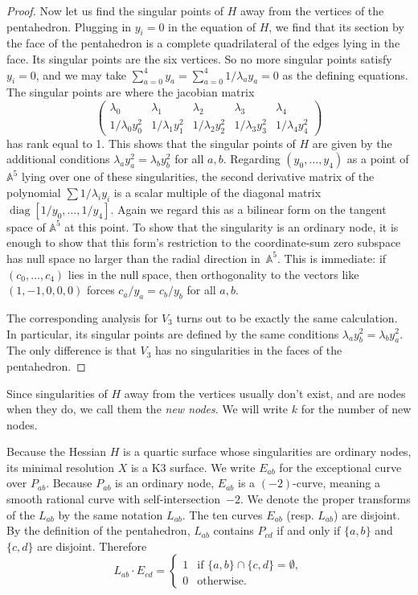 \documentclass[11pt]{article}
\theoremstyle{definition}
\numberwithin{equation}{section}
\numberwithin{figure}{section}
\numberwithin{table}{section}
\newcommand{\bbA}{{\mathbb{A}}}
\DeclareMathOperator{\diag}{diag}
\begin{document}
\begin{proof}
Now let us find the singular points of $H$ away from the vertices of the pentahedron. Plugging in $y_i = 0$ in the equation of $H$, we find that its section by the face of the pentahedron is a complete quadrilateral of the edges lying in the face. Its singular points are the six vertices. So no more singular points satisfy $y_i = 0$, and we may take $\sum_{a=0}^4y_a=\sum_{a=0}^4 1/\lambda_ay_a=0$ as the defining equations. The singular points are where the jacobian matrix
\[
\begin{pmatrix}
\lambda_0&\lambda_1&\lambda_2&\lambda_3&\lambda_4
\\
1/\lambda_0y_0^2&1/\lambda_1y_1^2&1/\lambda_2y_2^2&1/\lambda_3y_3^2&1/\lambda_4y_4^2
\end{pmatrix}
\]
has rank equal to 1. This shows that the singular points of $H$ are given by the additional conditions $\lambda_ay_a^2=\lambda_by_b^2$ for all $a,b$. Regarding $(y_0,\dots,y_4)$ as a point of $\bbA^5$ lying over one of these singularities, the second derivative matrix of the polynomial $\sum 1/\lambda_iy_i$ is a scalar multiple of the diagonal matrix $\diag[1/y_0,\dots,1/y_4]$. Again we regard this as a bilinear form on the tangent space of $\bbA^5$ at this point. To show that the singularity is an ordinary node, it is enough to show that this form's restriction to the coordinate-sum zero subspace has null space no larger than the radial direction in~$\bbA^5$. This is immediate: if $(c_0,\dots,c_4)$ lies in the null space, then orthogonality to the vectors like $(1,-1,0,0,0)$ forces $c_a/y_a=c_b/y_b$ for all $a,b$.

The corresponding analysis for $V_3$ turns out to be exactly the same calculation. In particular, its singular points are defined by the same conditions $\lambda_ay_b^2=\lambda_by_a^2$. The only difference is that $V_3$ has no singularities in the faces of the pentahedron.
\end{proof}

Since singularities of $H$ away from the vertices usually don't exist, and are nodes when they do, we call them the \emph{new nodes}. We will write $k$ for the number of new nodes.

Because the Hessian $H$ is a quartic surface whose singularities are ordinary nodes, its minimal resolution $X$ is a K3 surface. We write $E_{ab}$ for the exceptional curve over $P_{ab}$. Because $P_{ab}$ is an ordinary node, $E_{ab}$ is a $(-2)$-curve, meaning a smooth rational curve with self-intersection~$-2$. We denote the proper transforms of the $L_{ab}$ by the same notation $L_{ab}$. The ten curves $E_{ab}$ (resp. $L_{ab}$) are disjoint. By the definition of the pentahedron, $L_{ab}$ contains $P_{cd}$ if and only if $\{a,b\}$ and $\{c,d\}$ are disjoint. Therefore
\begin{equation}\label{intersection}
L_{ab}\cdot E_{cd} =
\begin{cases}
1&\text{if }\{a,b\}\cap \{c,d\} = \emptyset,\\
0&\text{otherwise.}
\end{cases}
\end{equation}
\end{document}
